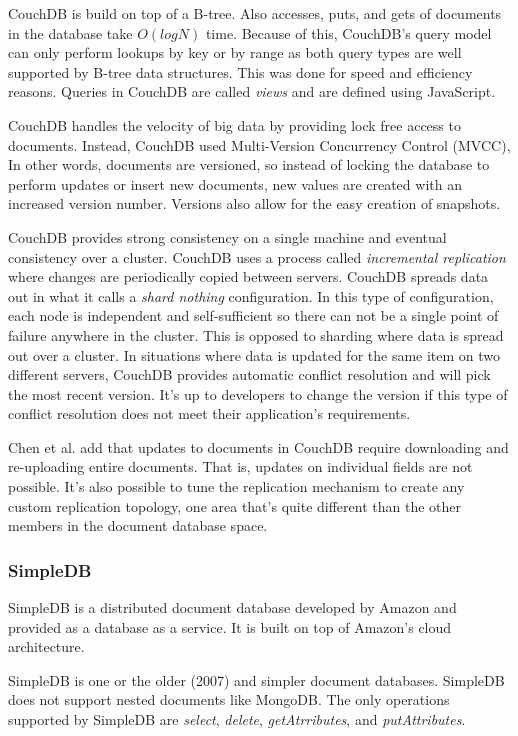 \documentclass[]{article}
\begin{document}
CouchDB is build on top of a B-tree. Also accesses, puts, and gets of documents in the database take $O(log N)$ time. Because of this, CouchDB's query model can only perform lookups by key or by range as both query types are well supported by B-tree data structures. This was done for speed and efficiency reasons. Queries in CouchDB are called \textit{views} and are defined using JavaScript\cite{cattell_scalable_2011}.

CouchDB handles the velocity of big data by providing lock free access to documents. Instead, CouchDB used Multi-Version Concurrency Control (MVCC), In other words, documents are versioned, so instead of locking the database to perform updates or insert new documents, new values are created with an increased version number. Versions also allow for the easy creation of snapshots.

CouchDB provides strong consistency on a single machine and eventual consistency over a cluster. CouchDB uses a process called \textit{incremental replication} where changes are periodically copied between servers. CouchDB spreads data out in what it calls a \textit{shard nothing} configuration. In this type of configuration, each node is independent and self-sufficient so there can not be a single point of failure anywhere in the cluster. This is opposed to sharding where data is spread out over a cluster. In situations where data is updated for the same item on two different servers, CouchDB provides automatic conflict resolution and will pick the most recent version. It's up to developers to change the version if this type of conflict resolution does not meet their application's requirements.

Chen et al\cite{chen_big_2014}. add that updates to documents in CouchDB require downloading and re-uploading entire documents. That is, updates on individual fields are not possible. It's also possible to tune the replication mechanism to create any custom replication topology, one area that's quite different than the other members in the document database space.

\subsubsection{SimpleDB}
SimpleDB\cite{cattell_scalable_2011} is a distributed document database developed by Amazon and provided as a database as a service. It is built on top of Amazon's cloud architecture. 

SimpleDB is one or the older (2007) and simpler document databases. SimpleDB does not support nested documents like MongoDB. The only operations supported by SimpleDB are \textit{select}, \textit{delete}, \textit{getAtrributes}, and \textit{putAttributes}.
\end{document}

